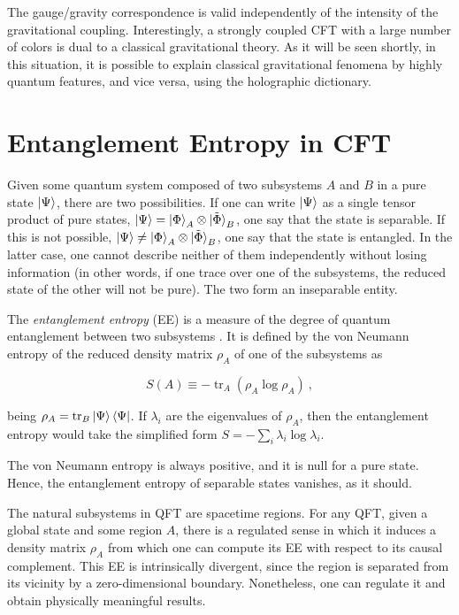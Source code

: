 \documentclass[twocolumn]{revtex4-2}
\providecommand{\eq}[2]{
    \begin{equation}
        #2
    \label{eq:#1}
    \end{equation}
}
\DeclareMathOperator{\tr}{tr}
\begin{document}
The gauge/gravity correspondence is valid independently of the intensity of the gravitational coupling. Interestingly, a strongly coupled CFT with a large number of colors is dual to a classical gravitational theory. As it will be seen shortly, in this situation, it is possible to explain classical gravitational fenomena by highly quantum features, and vice versa, using the holographic dictionary.


\section{Entanglement Entropy in CFT} \label{s:EE_CFT}

Given some quantum system composed of two subsystems $A$ and $B$ in a pure state $\ket{\Psi}$, there are two possibilities. If one can write $\ket{\Psi}$ as a single tensor product of pure states, $\ket{\Psi} = \ket{\Phi}_A \otimes \ket{\tilde{\Phi}}_B$, one say that the state is separable. If this is not possible, $\ket{\Psi} \neq \ket{\Phi}_A \otimes \ket{\tilde{\Phi}}_B$, one say that the state is entangled.
In the latter case, one cannot describe neither of them independently without losing information (in other words, if one trace over one of the subsystems, the reduced state of the other will not be pure). The two form an inseparable entity.

The \emph{entanglement entropy} (EE) is a measure of the degree of quantum entanglement between two subsystems \cite{nishioka_entanglement_2018}. It is defined by the von Neumann entropy of the reduced density matrix $\rho_A$ of one of the subsystems as
\eq{EE}{
    S(A) \equiv - \tr_A ( \rho_A \log \rho_A ) \ ,
}
being $\rho_A = \tr_B \ket{\Psi}\bra{\Psi}$. If $\lambda_i$ are the eigenvalues of $\rho_A$, then the entanglement entropy would take the simplified form $S = - \sum_i \lambda_i \log \lambda_i$.

The von Neumann entropy is always positive, and it is null for a pure state. Hence, the entanglement entropy of separable states vanishes, as it should. 


The natural subsystems in QFT are spacetime regions. For any QFT, given a global state and some region $A$, there is a regulated sense in which it induces a density matrix $\rho_A$ from which one can compute its EE with respect to its causal complement.
This EE is intrinsically divergent, since the region is separated from its vicinity by a zero-dimensional boundary. Nonetheless, one can regulate it and obtain physically meaningful results.
\end{document}
